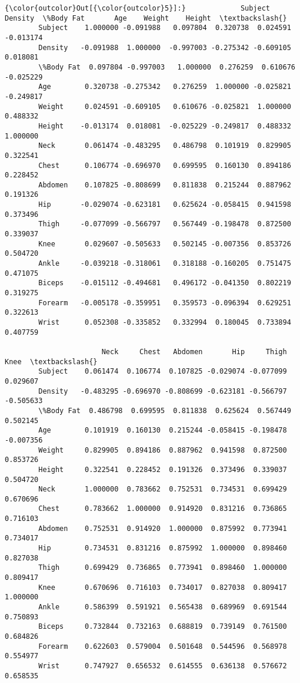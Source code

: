 \documentclass[11pt]{article}
\begin{document}
\begin{Verbatim}[commandchars=\\\{\}]
{\color{outcolor}Out[{\color{outcolor}5}]:}             Subject   Density  \%Body Fat       Age    Weight    Height  \textbackslash{}
        Subject    1.000000 -0.091988   0.097804  0.320738  0.024591 -0.013174   
        Density   -0.091988  1.000000  -0.997003 -0.275342 -0.609105  0.018081   
        \%Body Fat  0.097804 -0.997003   1.000000  0.276259  0.610676 -0.025229   
        Age        0.320738 -0.275342   0.276259  1.000000 -0.025821 -0.249817   
        Weight     0.024591 -0.609105   0.610676 -0.025821  1.000000  0.488332   
        Height    -0.013174  0.018081  -0.025229 -0.249817  0.488332  1.000000   
        Neck       0.061474 -0.483295   0.486798  0.101919  0.829905  0.322541   
        Chest      0.106774 -0.696970   0.699595  0.160130  0.894186  0.228452   
        Abdomen    0.107825 -0.808699   0.811838  0.215244  0.887962  0.191326   
        Hip       -0.029074 -0.623181   0.625624 -0.058415  0.941598  0.373496   
        Thigh     -0.077099 -0.566797   0.567449 -0.198478  0.872500  0.339037   
        Knee       0.029607 -0.505633   0.502145 -0.007356  0.853726  0.504720   
        Ankle     -0.039218 -0.318061   0.318188 -0.160205  0.751475  0.471075   
        Biceps    -0.015112 -0.494681   0.496172 -0.041350  0.802219  0.319275   
        Forearm   -0.005178 -0.359951   0.359573 -0.096394  0.629251  0.322613   
        Wrist      0.052308 -0.335852   0.332994  0.180045  0.733894  0.407759   
        
                       Neck     Chest   Abdomen       Hip     Thigh      Knee  \textbackslash{}
        Subject    0.061474  0.106774  0.107825 -0.029074 -0.077099  0.029607   
        Density   -0.483295 -0.696970 -0.808699 -0.623181 -0.566797 -0.505633   
        \%Body Fat  0.486798  0.699595  0.811838  0.625624  0.567449  0.502145   
        Age        0.101919  0.160130  0.215244 -0.058415 -0.198478 -0.007356   
        Weight     0.829905  0.894186  0.887962  0.941598  0.872500  0.853726   
        Height     0.322541  0.228452  0.191326  0.373496  0.339037  0.504720   
        Neck       1.000000  0.783662  0.752531  0.734531  0.699429  0.670696   
        Chest      0.783662  1.000000  0.914920  0.831216  0.736865  0.716103   
        Abdomen    0.752531  0.914920  1.000000  0.875992  0.773941  0.734017   
        Hip        0.734531  0.831216  0.875992  1.000000  0.898460  0.827038   
        Thigh      0.699429  0.736865  0.773941  0.898460  1.000000  0.809417   
        Knee       0.670696  0.716103  0.734017  0.827038  0.809417  1.000000   
        Ankle      0.586399  0.591921  0.565438  0.689969  0.691544  0.750893   
        Biceps     0.732844  0.732163  0.688819  0.739149  0.761500  0.684826   
        Forearm    0.622603  0.579004  0.501648  0.544596  0.568978  0.554977   
        Wrist      0.747927  0.656532  0.614555  0.636138  0.576672  0.658535   
        

\end{Verbatim}
\end{document}
